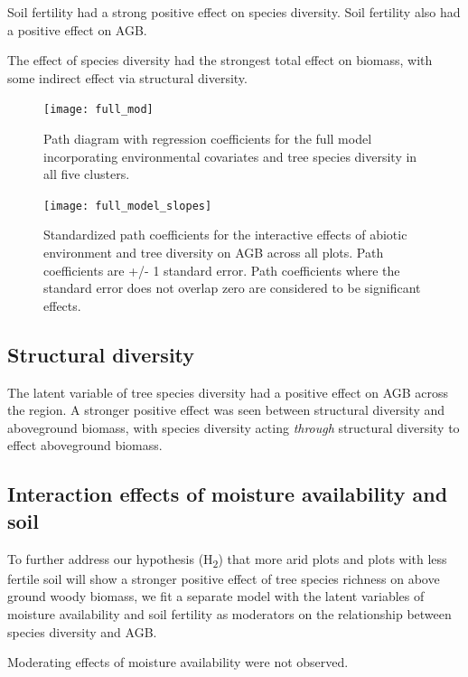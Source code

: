 \documentclass[11pt,a4paper]{article}
\begin{document}
Soil fertility had a strong positive effect on species diversity. Soil fertility also had a positive effect on AGB.  

The effect of species diversity had the strongest total effect on biomass, with some indirect effect via structural diversity.

\begin{figure}[H]
\centering
	\texttt{[image: full\_mod]}
	\caption{Path diagram with regression coefficients for the full model incorporating environmental covariates and tree species diversity in all five clusters.}
	\label{full_mod}
\end{figure}

\begin{figure}[H]
\centering
	\texttt{[image: full\_model\_slopes]}
	\caption{Standardized path coefficients for the interactive effects of abiotic environment and tree diversity on AGB across all plots. Path coefficients are +/- 1 standard error. Path coefficients where the standard error does not overlap zero are considered to be significant effects.}
	\label{full_model_slopes}
\end{figure}



\subsection{Structural diversity}

The latent variable of tree species diversity had a positive effect on AGB across the region. A stronger positive effect was seen between structural diversity and aboveground biomass, with species diversity acting \textit{through} structural diversity to effect aboveground biomass.

\subsection{Interaction effects of moisture availability and soil}

To further address our hypothesis (H\textsubscript{2}) that more arid plots and plots with less fertile soil will show a stronger positive effect of tree species richness on above ground woody biomass, we fit a separate model with the latent variables of moisture availability and soil fertility as moderators on the relationship between species diversity and AGB.

Moderating effects of moisture availability were not observed.
\end{document}
